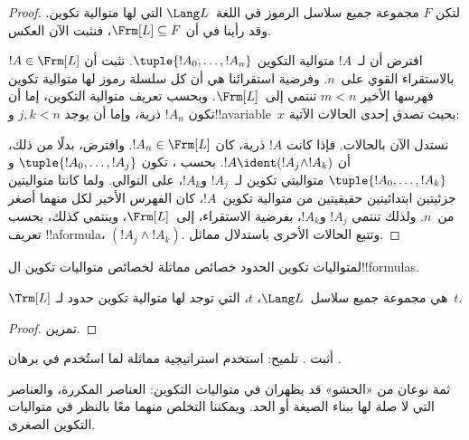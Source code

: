 \documentclass[../../../include/open-logic-section]{subfiles}
\begin{document}
\begin{proof}
لتكن $F$ مجموعة جميع سلاسل الرموز في اللغة~$\Lang L$ التي لها
متوالية تكوين. وقد رأينا في
 أن $\Frm[L] \subseteq F$،
فنثبت الآن العكس.

افترض أن لـ~$!A$ متوالية التكوين
$\tuple{!A_0,\dotsc,!A_n}$. نثبت أن $!A \in \Frm[L]$ بالاستقراء
القوي على~$n$. وفرضية استقرائنا هي أن كل سلسلة رموز لها متوالية
تكوين فهرسها الأخير $m < n$ تنتمي إلى~$\Frm[L]$. وبحسب تعريف
متوالية التكوين، إما أن تكون $!A_n$ ذرية، وإما أن يوجد $j,k < n$
و!!a{variable}~$x$ بحيث تصدق إحدى الحالات الآتية:
\begin{enumerate}
\end{enumerate}
نستدل الآن بالحالات. فإذا كانت $!A$ ذرية، كان
$!A_n \in \Frm[L]$. وافترض، بدلًا من ذلك، أن
$!A \ident (!A_j \land !A_k)$. بحسب
،
تكون $\tuple{!A_0,\dotsc,!A_j}$ و$\tuple{!A_0,\dotsc,!A_k}$
متواليتي تكوين لـ~$!A_j$ و$!A_k$، على التوالي. ولما كانتا متواليتين
جزئيتين ابتدائيتين حقيقيتين من متوالية تكوين~$!A$، كان الفهرس
الأخير لكل منهما أصغر من~$n$. ولذلك تنتمي $!A_j$ و$!A_k$، بفرضية
الاستقراء، إلى~$\Frm[L]$، وينتمي كذلك، بحسب تعريف !!a{formula}،
$(!A_j \land !A_k)$. وتتبع الحالات الأخرى باستدلال مماثل.
\end{proof}

لمتواليات تكوين الحدود خصائص مماثلة لخصائص متواليات تكوين
ال!!{formula}s.

\begin{prop}
$\Trm[L]$ هي مجموعة جميع سلاسل~$\Lang L$، $t$، التي توجد لها
متوالية تكوين حدود لـ~$t$.
\end{prop}

\begin{proof}
تمرين.
\end{proof}

\begin{prob}
أثبت .
تلميح: استخدم استراتيجية مماثلة لما استُخدم في برهان
.
\end{prob}

ثمة نوعان من «الحشو» قد يظهران في متواليات التكوين: العناصر
المكررة، والعناصر التي لا صلة لها ببناء الصيغة أو الحد. ويمكننا
التخلص منهما معًا بالنظر في متواليات التكوين الصغرى.
\end{document}
